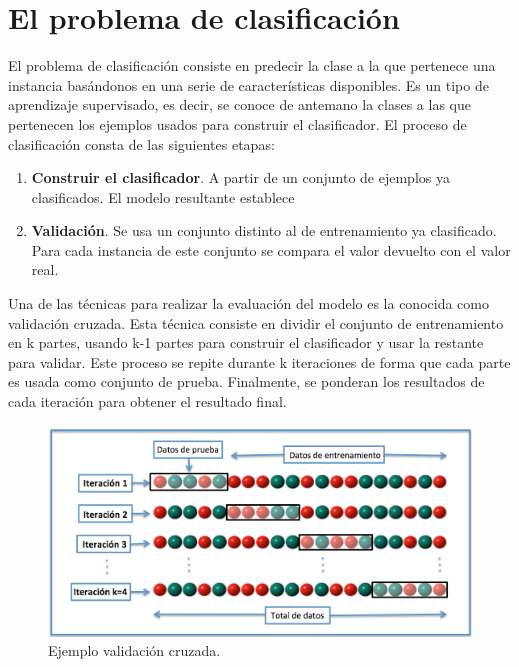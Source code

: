 \chapter{El problema de clasificación}\label{aped.F}
El problema de clasificación consiste en predecir la clase a la que pertenece una instancia basándonos en una serie de características disponibles. Es un tipo de aprendizaje supervisado, es decir, se conoce de antemano la clases a las que pertenecen los ejemplos usados para construir el clasificador.
El proceso de clasificación consta de las siguientes etapas:

\begin{enumerate}
	\item \textbf{Construir el clasificador}. A partir de un conjunto de ejemplos ya clasificados. El modelo resultante establece 
	\item \textbf{Validación}. Se usa un conjunto distinto al de entrenamiento ya clasificado. Para cada instancia de este conjunto se compara el valor devuelto con el valor real.
\end{enumerate}

Una de las técnicas para realizar la evaluación del modelo es la conocida como validación cruzada. Esta técnica consiste en dividir el conjunto de entrenamiento en k partes, usando k-1 partes para construir el clasificador y usar la restante para validar. Este proceso se repite durante k iteraciones de forma que cada parte es usada como conjunto de prueba. Finalmente, se ponderan los resultados de cada iteración para obtener el resultado final.
\begin{figure}
	\centering
	\includegraphics[scale=0.45]{img/K-fold_cross_validation.jpg}
	\caption{Ejemplo validación cruzada.}
\end{figure}
